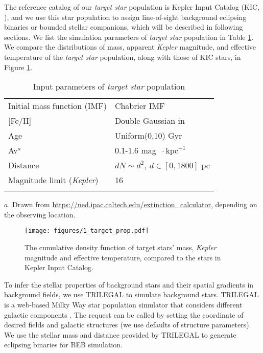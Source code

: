 \documentclass{aastex63}
\begin{document}
The reference catalog of our \emph{target star} population is Kepler Input Catalog (KIC, \cite{2011AJ....142..112B}), and we use this star population to assign line-of-sight background eclipsing binaries or bounded stellar companions, which will be described in following sections. We list the simulation parameters of \emph{target star} population in Table \ref{tab:target_star_prop}. We compare the distributions of mass, apparent \emph{Kepler} magnitude, and effective temperature of the \emph{target star} population, along with those of KIC stars, in Figure \ref{Fig1:m_kp_teff_compare}.

\begin{table}[ht]
    \begin{center}
    \caption{Input parameters of \emph{target star} population}
    \label{tab:target_star_prop}
    \begin{tabular}{ll}
      \hline\noalign{\smallskip}
        Initial mass function (IMF)      & Chabrier IMF       \\
        {[}Fe/H{]}                       & Double-Gaussian in \citep{Casagrande2011}     \\
        Age        & Uniform(0,10) Gyr       \\
        Av$^a$         & 0.1-1.6 mag $~\cdot \mathrm{kpc}^{-1}$    \\
        Distance   & $dN \sim d^2,~d \in [0,1800]$ pc \\
        Magnitude limit (\emph{Kepler}) & 16 \\
        
      \noalign{\smallskip}\hline
    \end{tabular}
    
    \footnotesize{$a$. Drawn from \url{https://ned.ipac.caltech.edu/extinction_calculator}, depending on the observing location.}
    \end{center}
    \end{table}

    \begin{figure}[ht]
    \centering
    \texttt{[image: figures/1\_target\_prop.pdf]}
    \caption{The cumulative density function of target stars' mass, \emph{Kepler} magnitude and effective temperature, compared to the stars in Kepler Input Catalog.}
    \label{Fig1:m_kp_teff_compare}
    \end{figure}

To infer the stellar properties of background stars and their spatial gradients in background fields, we use TRILEGAL to simulate background stars. TRILEGAL is a web-based Milky Way star population simulator that considers different galactic components \citep{Girardi2005}. The request can be called by setting the coordinate of desired fields and galactic structures (we use defaults of structure parameters). We use the stellar mass and distance provided by TRILEGAL to generate eclipsing binaries for BEB simulation. 
\end{document}

